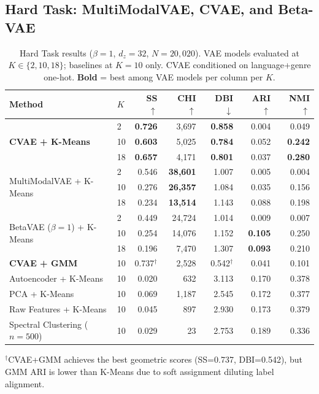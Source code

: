 \documentclass{article}
\begin{document}
\subsection{Hard Task: MultiModalVAE, CVAE, and Beta-VAE}

\begin{table}[H]
\centering
\caption{Hard Task results ($\beta\!=\!1$, $d_z\!=\!32$, $N\!=\!20{,}020$). VAE models evaluated at $K\!\in\!\{2,10,18\}$; baselines at $K\!=\!10$ only. CVAE conditioned on language+genre one-hot. \textbf{Bold} = best among VAE models per column per $K$.}
\label{tab:hard}
\small
\begin{tabular}{llrrrrr}
\toprule
\textbf{Method} & \textbf{$K$} & \textbf{SS $\uparrow$} & \textbf{CHI $\uparrow$} & \textbf{DBI $\downarrow$} & \textbf{ARI $\uparrow$} & \textbf{NMI $\uparrow$} \\
\midrule
\multirow{3}{*}{\textbf{CVAE + K-Means}}
 & 2  & \textbf{0.726} & 3,697  & \textbf{0.858} & 0.004 & 0.049 \\
 & 10 & \textbf{0.603} & 5,025  & \textbf{0.784} & 0.052 & \textbf{0.242} \\
 & 18 & \textbf{0.657} & 4,171  & \textbf{0.801} & 0.037 & \textbf{0.280} \\
\midrule
\multirow{3}{*}{MultiModalVAE + K-Means}
 & 2  & 0.546 & \textbf{38,601} & 1.007 & 0.005 & 0.004 \\
 & 10 & 0.276 & \textbf{26,357} & 1.084 & 0.035 & 0.156 \\
 & 18 & 0.234 & \textbf{13,514} & 1.143 & 0.088 & 0.198 \\
\midrule
\multirow{3}{*}{BetaVAE ($\beta\!=\!1$) + K-Means}
 & 2  & 0.449 & 24,724 & 1.014 & 0.009 & 0.007 \\
 & 10 & 0.254 & 14,076 & 1.152 & \textbf{0.105} & 0.250 \\
 & 18 & 0.196 & 7,470  & 1.307 & \textbf{0.093} & 0.210 \\
\midrule
\textbf{CVAE + GMM} & 10 & 0.737$^\dagger$ & 2,528 & 0.542$^\dagger$ & 0.041 & 0.101 \\
\midrule
\rowcolor{gray!15} Autoencoder + K-Means & 10 & 0.020 & 632 & 3.113 & 0.170 & 0.378 \\
\rowcolor{gray!15} PCA + K-Means & 10 & 0.069 & 1,187 & 2.545 & 0.172 & 0.377 \\
\rowcolor{gray!15} Raw Features + K-Means & 10 & 0.045 & 897 & 2.930 & 0.173 & 0.379 \\
\rowcolor{gray!15} Spectral Clustering ($n\!=\!500$) & 10 & 0.029 & 23 & 2.753 & 0.189 & 0.336 \\
\bottomrule
\end{tabular}
\vspace{2pt}
{\small $^\dagger$CVAE+GMM achieves the best geometric scores (SS=0.737, DBI=0.542), but GMM ARI is lower than K-Means due to soft assignment diluting label alignment.}
\end{table}
\end{document}
